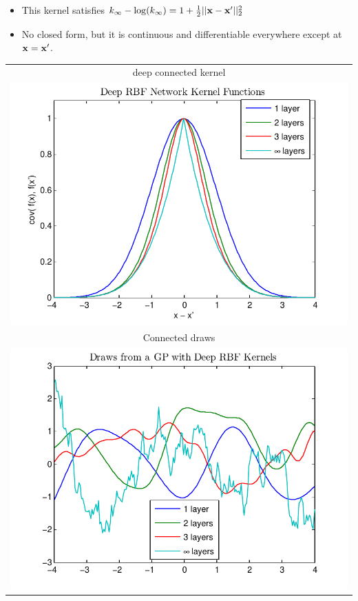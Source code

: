 \documentclass[portrait,a0b,final,a4resizeable]{include/a0poster}
\begin{document}
\begin{poster}
\begin{multicols}{2}
\begin{minipage}[c]{0.5\columnwidth}
\begin{itemize}
\item This kernel satisfies $k_\infty - \log(k_\infty) = 1 + \frac{1}{2} || \mathbf{x} - \mathbf{x}' ||_2^2$
\item No closed form, but it is continuous and differentiable everywhere except at $\mathbf{x} = \mathbf{x}'$.
\end{itemize}
\end{minipage}
\begin{minipage}[c]{0.39\columnwidth}
\begin{centering}
\begin{tabular}{c}
deep connected kernel \\
\hspace{-0.5cm}\includegraphics[width=\columnwidth, clip, trim = 0cm 0cm 1cm 0.61cm]{../figures/deep_kernel_connected} \\
Connected \gp{} draws \\
\hspace{-0.5cm}\includegraphics[width=\columnwidth, clip, trim = 0cm 0cm 1cm 0.61cm]{../figures/deep_kernel_connected_draws}

\end{tabular}
\end{centering}
\end{minipage}
\end{multicols}
\end{poster}
\end{document}
